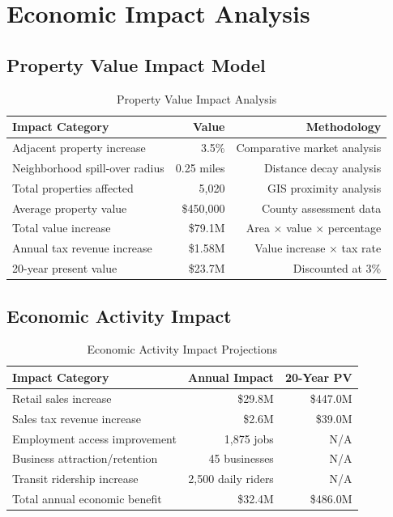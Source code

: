 \documentclass[11pt,letterpaper]{article}
\begin{document}
\section{Economic Impact Analysis}

\subsection{Property Value Impact Model}

\begin{table}[h]
\centering
\caption{Property Value Impact Analysis}
\begin{tabular}{lrr}
\toprule
\textbf{Impact Category} & \textbf{Value} & \textbf{Methodology} \\
\midrule
Adjacent property increase & 3.5\% & Comparative market analysis \\
Neighborhood spill-over radius & 0.25 miles & Distance decay analysis \\
Total properties affected & 5,020 & GIS proximity analysis \\
Average property value & \$450,000 & County assessment data \\
Total value increase & \$79.1M & Area × value × percentage \\
Annual tax revenue increase & \$1.58M & Value increase × tax rate \\
20-year present value & \$23.7M & Discounted at 3\% \\
\bottomrule
\end{tabular}
\end{table}

\subsection{Economic Activity Impact}

\begin{table}[h]
\centering
\caption{Economic Activity Impact Projections}
\begin{tabular}{lrr}
\toprule
\textbf{Impact Category} & \textbf{Annual Impact} & \textbf{20-Year PV} \\
\midrule
Retail sales increase & \$29.8M & \$447.0M \\
Sales tax revenue increase & \$2.6M & \$39.0M \\
Employment access improvement & 1,875 jobs & N/A \\
Business attraction/retention & 45 businesses & N/A \\
Transit ridership increase & 2,500 daily riders & N/A \\
Total annual economic benefit & \$32.4M & \$486.0M \\
\bottomrule
\end{tabular}
\end{table}
\end{document}
